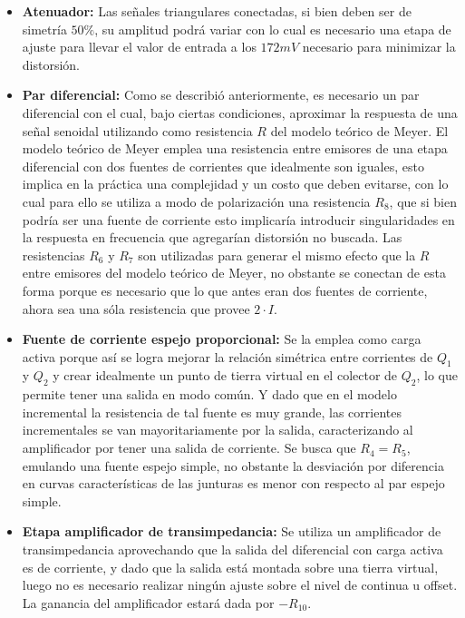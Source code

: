 \begin{itemize}
    \item \textbf{Atenuador:} Las se\~nales triangulares conectadas, si bien deben ser de simetr\'ia $50\%$, su amplitud podr\'a variar con lo cual es necesario una etapa de ajuste para 
    llevar el valor de entrada a los $172mV$ necesario para minimizar la distorsi\'on.
    \item \textbf{Par diferencial:} Como se describi\'o anteriormente, es necesario un par diferencial con el cual, bajo ciertas condiciones, aproximar la respuesta de una se\~nal senoidal utilizando como resistencia $R$
    del modelo te\'orico de Meyer. El modelo te\'orico de Meyer emplea una resistencia entre emisores de una etapa diferencial con dos fuentes de corrientes que idealmente son iguales, esto implica en la pr\'actica una complejidad y un costo
    que deben evitarse, con lo cual para ello se utiliza a modo de polarizaci\'on una resistencia $R_8$, que si bien podr\'ia ser una fuente de corriente esto implicar\'ia introducir singularidades en la respuesta en frecuencia que agregar\'ian
    distorsi\'on no buscada. Las resistencias $R_6$ y $R_7$ son utilizadas para generar el mismo efecto que la $R$ entre emisores del modelo te\'orico de Meyer, no obstante se conectan de esta forma porque es necesario que lo que antes eran dos fuentes de corriente,
    ahora sea una s\'ola resistencia que provee $2 \cdot I$.
    \item \textbf{Fuente de corriente espejo proporcional:} Se la emplea como carga activa porque as\'i se logra mejorar la relaci\'on sim\'etrica entre corrientes de $Q_1$ y $Q_2$ y crear idealmente un punto de tierra virtual en el colector de $Q_2$,
    lo que permite tener una salida en modo com\'un. Y dado que en el modelo incremental la resistencia de tal fuente es muy grande, las corrientes incrementales se van mayoritariamente por la salida, caracterizando al amplificador
    por tener una salida de corriente. Se busca que $R_4 = R_5$, emulando una fuente espejo simple, no obstante la desviaci\'on por diferencia en curvas caracter\'isticas de las junturas
    es menor con respecto al par espejo simple.
    \item \textbf{Etapa amplificador de transimpedancia:} Se utiliza un amplificador de transimpedancia aprovechando que la salida del diferencial con carga activa es de corriente, y dado que la salida est\'a montada sobre una tierra virtual,
    luego no es necesario realizar ning\'un ajuste sobre el nivel de continua u offset. La ganancia del amplificador estar\'a dada por $-R_{10}$.
\end{itemize}

